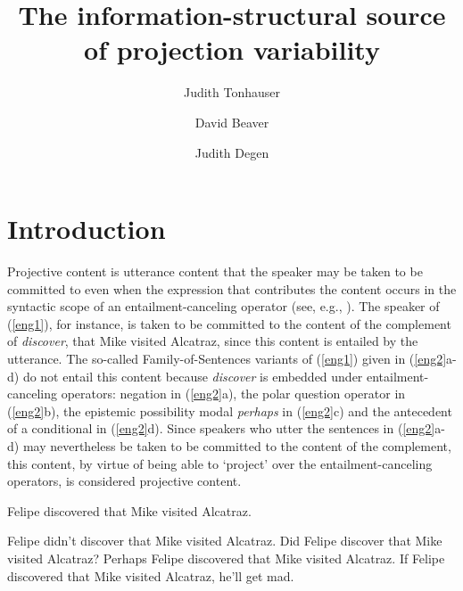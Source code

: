 \documentclass[11pt,fleqn]{article}
\title{The information-structural source of projection variability}
\author[$\bullet$]{Judith Tonhauser}
\author[$\circ$]{David Beaver}
\author[$\triangleright$]{Judith Degen}
\affil[$\bullet$]{The Ohio State University}
\affil[$\circ$]{University of Texas at Austin}
\affil[$\triangleright$]{Stanford University}
\newcommand{\6}{\mbox{$[\hspace*{-.6mm}[$}}
\newcommand{\9}{\mbox{$]\hspace*{-.6mm}]$}}
\begin{document}
\maketitle

\begin{abstract}

\end{abstract}


			
\section{Introduction}\label{s1}

Projective content is utterance content that the speaker may be taken to be committed to even when the expression that contributes the content occurs in the syntactic scope of an entailment-canceling operator (see, e.g., \citealt{ccmg90}). The speaker of (\ref{eng1}), for instance, is taken to be committed to the content of the complement of {\em discover}, that Mike visited Alcatraz, since this content is entailed by the utterance. The so-called Family-of-Sentences variants of (\ref{eng1}) given in (\ref{eng2}a-d) do not entail this content because {\em discover} is embedded under entailment-canceling operators: negation in (\ref{eng2}a), the polar question operator in (\ref{eng2}b), the epistemic possibility modal {\em perhaps} in (\ref{eng2}c) and the antecedent of a conditional in (\ref{eng2}d). Since speakers who utter the sentences in (\ref{eng2}a-d) may nevertheless be taken to be committed to the content of the complement, this content, by virtue of being able to `project' over the entailment-canceling operators, is considered projective content. 

\begin{exe}
\ex\label{eng1}  Felipe discovered that Mike visited Alcatraz.

\ex\label{eng2}
\begin{xlist} 
\ex Felipe didn't discover that Mike visited Alcatraz.
\ex Did Felipe discover that Mike visited Alcatraz?
\ex Perhaps Felipe discovered that Mike visited Alcatraz.
\ex If Felipe discovered that Mike visited Alcatraz, he'll get mad.
\end{xlist}
\end{exe}
\end{document}
